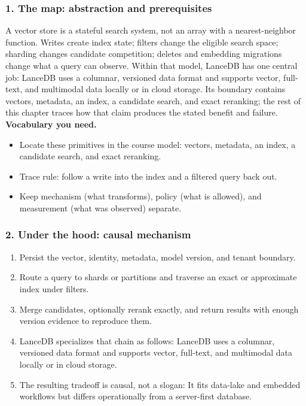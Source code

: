 \subsubsection*{1. The map: abstraction and prerequisites}
A vector store is a stateful search system, not an array with a nearest-neighbor function. Writes create index state; filters change the eligible search space; sharding changes candidate competition; deletes and embedding migrations change what a query can observe.
Within that model, LanceDB has one central job: LanceDB uses a columnar, versioned data format and supports vector, full-text, and multimodal data locally or in cloud storage. Its boundary contains vectors, metadata, an index, a candidate search, and exact reranking; the rest of this chapter traces how that claim produces the stated benefit and failure.
\textbf{Vocabulary you need.}\begin{itemize}
\item Locate these primitives in the course model: vectors, metadata, an index, a candidate search, and exact reranking.
\item Trace rule: follow a write into the index and a filtered query back out.
\item Keep mechanism (what transforms), policy (what is allowed), and measurement (what was observed) separate.
\end{itemize}
\subsubsection*{2. Under the hood: causal mechanism}\begin{enumerate}
\item Persist the vector, identity, metadata, model version, and tenant boundary.
\item Route a query to shards or partitions and traverse an exact or approximate index under filters.
\item Merge candidates, optionally rerank exactly, and return results with enough version evidence to reproduce them.
\item LanceDB specializes that chain as follows: LanceDB uses a columnar, versioned data format and supports vector, full-text, and multimodal data locally or in cloud storage.
\item The resulting tradeoff is causal, not a slogan: It fits data-lake and embedded workflows but differs operationally from a server-first database.
\end{enumerate}
